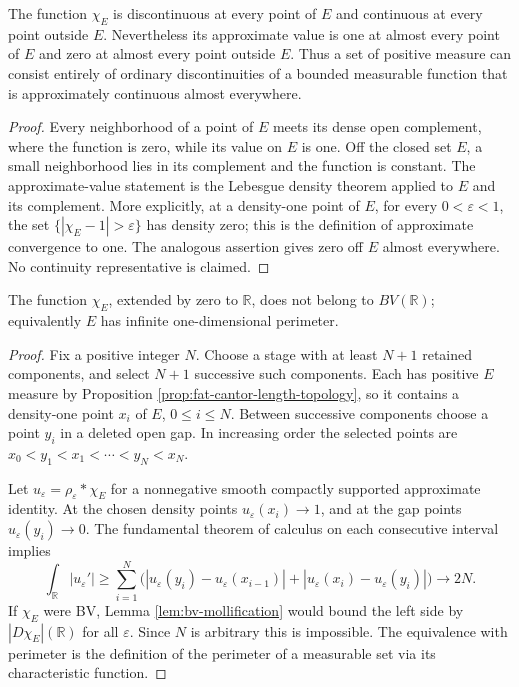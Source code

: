 \begin{example}\label{ex:fat-cantor-approximate-continuity}
The function $\chi_E$ is discontinuous at every point of $E$ and continuous at every point outside $E$. Nevertheless its approximate value is one at almost every point of $E$ and zero at almost every point outside $E$. Thus a set of positive measure can consist entirely of ordinary discontinuities of a bounded measurable function that is approximately continuous almost everywhere.
\end{example}
\begin{proof}
Every neighborhood of a point of $E$ meets its dense open complement, where the function is zero, while its value on $E$ is one. Off the closed set $E$, a small neighborhood lies in its complement and the function is constant. The approximate-value statement is the Lebesgue density theorem applied to $E$ and its complement. More explicitly, at a density-one point of $E$, for every $0<\varepsilon<1$, the set $\{|\chi_E-1|>\varepsilon\}$ has density zero; this is the definition of approximate convergence to one. The analogous assertion gives zero off $E$ almost everywhere. No continuity representative is claimed.
\end{proof}

\begin{proposition}\label{prop:fat-cantor-infinite-variation}
The function $\chi_E$, extended by zero to $\mathbb R$, does not belong to $BV(\mathbb R)$; equivalently $E$ has infinite one-dimensional perimeter.
\end{proposition}
\begin{proof}
Fix a positive integer $N$. Choose a stage with at least $N+1$ retained components, and select $N+1$ successive such components. Each has positive $E$ measure by Proposition \ref{prop:fat-cantor-length-topology}, so it contains a density-one point $x_i$ of $E$, $0\le i\le N$. Between successive components choose a point $y_i$ in a deleted open gap. In increasing order the selected points are $x_0<y_1<x_1<\cdots<y_N<x_N$.

Let $u_\varepsilon=\rho_\varepsilon*\chi_E$ for a nonnegative smooth compactly supported approximate identity. At the chosen density points $u_\varepsilon(x_i)\to1$, and at the gap points $u_\varepsilon(y_i)\to0$. The fundamental theorem of calculus on each consecutive interval implies
\[
 \int_{\mathbb R}|u_\varepsilon'|\ge
 \sum_{i=1}^N\bigl(|u_\varepsilon(y_i)-u_\varepsilon(x_{i-1})|
                  +|u_\varepsilon(x_i)-u_\varepsilon(y_i)|\bigr)\longrightarrow2N.
\]
If $\chi_E$ were BV, Lemma \ref{lem:bv-mollification} would bound the left side by $|D\chi_E|(\mathbb R)$ for all $\varepsilon$. Since $N$ is arbitrary this is impossible. The equivalence with perimeter is the definition of the perimeter of a measurable set via its characteristic function.
\end{proof}

